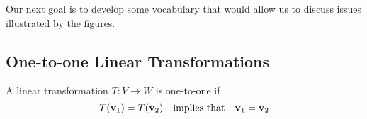 \documentclass{ximera}
\renewcommand{\vec}[1]{{\bf #1}}
\begin{document}
Our next goal is to develop some vocabulary that would allow us to discuss issues illustrated by the figures.

\begin{center}
\end{center}

\begin{center}
\quad\quad
{}
\end{center}


\subsection*{One-to-one Linear Transformations}

\begin{definition}\label{def:onetoone} A linear transformation $T:V\rightarrow W$ is one-to-one if 
$$T(\vec{v}_1)=T(\vec{v}_2)\quad \text{implies that}\quad \vec{v}_1=\vec{v}_2$$
\end{definition}
\end{document}
